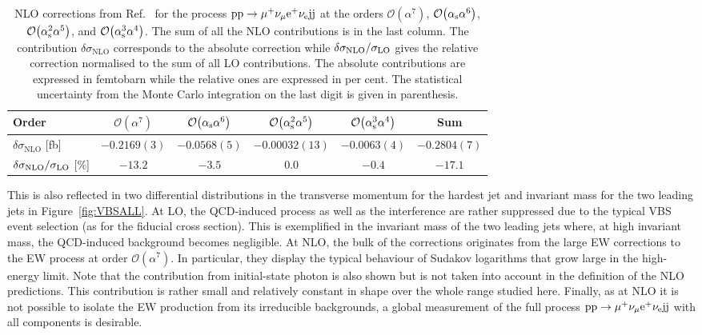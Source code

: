 \begin{table}
\begin{center}
\begin{tabular}{|l||c|c|c|c||c|}
\hline
Order & $\mathcal{O}{\left(\alpha^{7}\right)}$ & $\mathcal{O}{\left(\alpha_{\rm s}\alpha^{6}\right)}$ & $\mathcal{O}{\left(\alpha_{\rm s}^{2}\alpha^{5}\right)}$ & $\mathcal{O}{\left(\alpha_{\rm s}^{3}\alpha^{4}\right)}$ & Sum \\
\hline
\hline 
${\delta \sigma_{\mathrm{NLO}}}$ [fb] 
& $-0.2169(3)$ 
& $-0.0568(5)$
& $-0.00032(13)$
& $-0.0063(4)$ 
& $-0.2804(7)$ \\
\hline
$\delta \sigma_{\mathrm{NLO}}/\sigma_{\rm LO}$ [\%] & $-13.2$ & $-3.5$ & $0.0$ & $-0.4$ & $-17.1$ \\
\hline
\end{tabular}
\end{center}
\caption{
NLO corrections from Ref.~\cite{Biedermann:2017bss} for the process ${\rm p}{\rm p}\to\mu^+\nu_\mu{\rm e}^+\nu_{\rm e}{\rm j}{\rm j}$ at the orders 
$\mathcal{O}{\left(\alpha^{7}\right)}$, $\mathcal{O}{\left(\alpha_{\rm s}\alpha^{6}\right)}$, $\mathcal{O}{\left(\alpha_{\rm s}^{2}\alpha^{5}\right)}$, and $\mathcal{O}{\left(\alpha_{\rm s}^{3}\alpha^{4}\right)}$.
The sum of all the NLO contributions is in the last column.
The contribution $\delta\sigma_{\mathrm{NLO}}$ corresponds to the absolute correction while $\delta \sigma_{\mathrm{NLO}}/\sigma_{\rm LO}$ gives the relative correction normalised to the sum of all LO contributions.
The absolute contributions are expressed in femtobarn while the relative ones are expressed in per cent.
The statistical uncertainty from the Monte Carlo integration on the last digit is given in parenthesis.}
\label{table:NLOVBS}
\end{table}

This is also reflected in two differential distributions in the transverse momentum for the hardest jet and invariant mass for the two leading jets in Figure~\ref{fig:VBSALL}.
At LO, the QCD-induced process as well as the interference are rather suppressed due to the typical VBS event selection (as for the fiducial cross section).
This is exemplified in the invariant mass of the two leading jets where, at high invariant mass, the QCD-induced background becomes negligible.
At NLO, the bulk of the corrections originates from the large EW corrections to the EW process at order $\mathcal{O}{\left(\alpha^{7}\right)}$.
In particular, they display the typical behaviour of Sudakov logarithms that grow large in the high-energy limit.
Note that the contribution from initial-state photon is also shown but is not taken into account in the definition of the NLO predictions.
This contribution is rather small and relatively constant in shape over the whole range studied here.
Finally, as at NLO it is not possible to isolate the EW production from its irreducible backgrounds, a global measurement of the full process ${\rm p}{\rm p}\to\mu^+\nu_\mu{\rm e}^+\nu_{\rm e}{\rm j}{\rm j}$ with all components is desirable.

